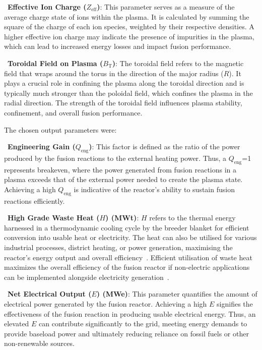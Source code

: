 \documentclass[journal]{IEEEtran}
\begin{document}
~\textbf{Effective Ion Charge ($Z_{\text{eff}}$)}: This parameter serves as a measure of the average charge state of ions within the plasma. It is calculated by summing the square of the charge of each ion species, weighted by their respective densities. A higher effective ion charge may indicate the presence of impurities in the plasma, which can lead to increased energy losses and impact fusion performance.

~\textbf{Toroidal Field on Plasma ($B_{\text{T}}$)}: The toroidal field refers to the magnetic field that wraps around the torus in the direction of the major radius ($R$). It plays a crucial role in confining the plasma along the toroidal direction and is typically much stronger than the poloidal field, which confines the plasma in the radial direction. The strength of the toroidal field influences plasma stability, confinement, and overall fusion performance. 

The chosen output parameters were:

~\textbf{Engineering Gain ($Q_{\text{eng}}$)}: This factor is defined as the ratio of the power produced by the fusion reactions to the external heating power. Thus, a $Q_{\text{eng}}$=1 represents breakeven, where the power generated from fusion reactions in a plasma exceeds that of the external power needed to create the plasma state. Achieving a high $Q_{\text{eng}}$ is indicative of the reactor's ability to sustain fusion reactions efficiently.

~\textbf{High Grade Waste Heat ($H$) (MWt)}: $H$ refers to the thermal energy harnessed in a thermodynamic cooling cycle by the breeder blanket for efficient conversion into usable heat or electricity. The heat can also be utilised for various industrial processes, district heating, or power generation, maximising the reactor's energy output and overall efficiency~\cite{Griffiths2022}. Efficient utilisation of waste heat maximizes the overall efficiency of the fusion reactor if non-electric applications can be implemented alongside electricity generation~\cite{Hidalgo-Salaverri2023}.

~\textbf{Net Electrical Output ($E$) (MWe)}: This parameter quantifies the amount of electrical power generated by the fusion reactor. Achieving a high $E$ signifies the effectiveness of the fusion reaction in producing usable electrical energy. Thus, an elevated $E$ can contribute significantly to the grid, meeting energy demands to provide baseload power and ultimately reducing reliance on fossil fuels or other non-renewable sources.
\end{document}
